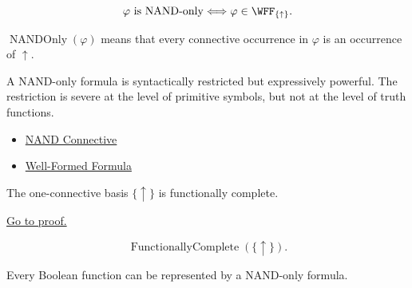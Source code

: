 \begin{remark*}
\[
\varphi\text{ is NAND-only}
\Longleftrightarrow
\varphi\in\WFF_{\{\uparrow\}}.
\]
\end{remark*}

\begin{remark*}
\(\operatorname{NANDOnly}(\varphi)\) means that every connective occurrence in
\(\varphi\) is an occurrence of \(\uparrow\).
\end{remark*}

\begin{remark*}[Interpretation]
A NAND-only formula is syntactically restricted but expressively powerful. The
restriction is severe at the level of primitive symbols, but not at the level of
truth functions.
\end{remark*}

\begin{dependencies}
\begin{itemize}
  \item \hyperref[def:nand-connective-propositional-logic]{NAND Connective}
  \item \hyperref[def:well-formed-formula]{Well-Formed Formula}
\end{itemize}
\end{dependencies}

\begin{tcolorbox}[colback=thmbox, colframe=thmborder, arc=2pt,
  left=6pt, right=6pt, top=4pt, bottom=4pt,
  title={\small\textbf{Theorem (NAND is Functionally Complete)}},
  fonttitle=\small\bfseries]
\begin{theorem}
\label{thm:nand-functionally-complete-propositional-logic}
The one-connective basis \(\{\uparrow\}\) is functionally complete.

\noindent\hyperref[prf:nand-functionally-complete-propositional-logic]{Go to proof.}
\end{theorem}
\end{tcolorbox}

\begin{remark*}
\[
\operatorname{FunctionallyComplete}(\{\uparrow\}).
\]
\end{remark*}

\begin{remark*}
Every Boolean function can be represented by a NAND-only formula.
\end{remark*}

